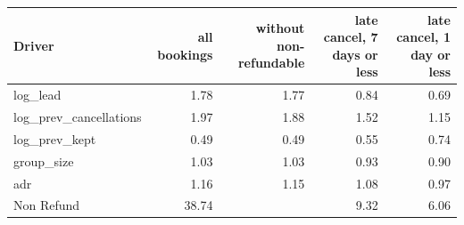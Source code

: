 \begin{tabular}{lrrrr}
\toprule
Driver & all bookings & without non-refundable & late cancel, 7 days or less & late cancel, 1 day or less \\
\midrule
log\_lead & 1.78 & 1.77 & 0.84 & 0.69 \\
log\_prev\_cancellations & 1.97 & 1.88 & 1.52 & 1.15 \\
log\_prev\_kept & 0.49 & 0.49 & 0.55 & 0.74 \\
group\_size & 1.03 & 1.03 & 0.93 & 0.90 \\
adr & 1.16 & 1.15 & 1.08 & 0.97 \\
Non Refund & 38.74 &  & 9.32 & 6.06 \\
\bottomrule
\end{tabular}
